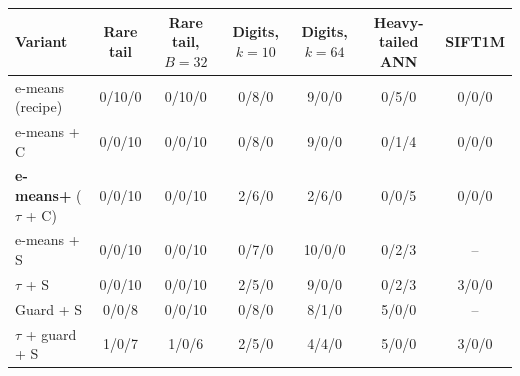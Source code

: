 \begin{tabular}{lcccccc}
\toprule
Variant & Rare tail & Rare tail, $B{=}32$ & Digits, $k{=}10$ & Digits, $k{=}64$ & Heavy-tailed ANN & SIFT1M \\
\midrule
e-means (recipe) & 0/10/0 & 0/10/0 & 0/8/0 & 9/0/0 & 0/5/0 & 0/0/0 \\
e-means + C & 0/0/10 & 0/0/10 & 0/8/0 & 9/0/0 & 0/1/4 & 0/0/0 \\
\textbf{e-means+} ($\tau$ + C) & 0/0/10 & 0/0/10 & 2/6/0 & 2/6/0 & 0/0/5 & 0/0/0 \\
e-means + S & 0/0/10 & 0/0/10 & 0/7/0 & 10/0/0 & 0/2/3 & -- \\
$\tau$ + S & 0/0/10 & 0/0/10 & 2/5/0 & 9/0/0 & 0/2/3 & 3/0/0 \\
Guard + S & 0/0/8 & 0/0/10 & 0/8/0 & 8/1/0 & 5/0/0 & -- \\
$\tau$ + guard + S & 1/0/7 & 1/0/6 & 2/5/0 & 4/4/0 & 5/0/0 & 3/0/0 \\
\bottomrule
\end{tabular}
